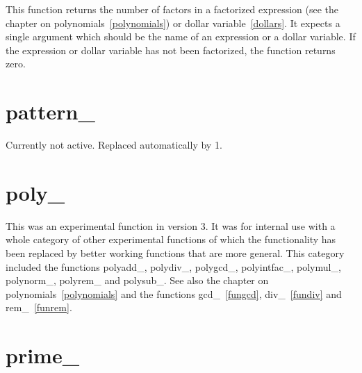 \noindent This function returns the number of factors in a factorized 
expression (see the chapter on polynomials~\ref{polynomials}) or dollar 
variable~\ref{dollars}. It expects a single argument which should be the 
name of an expression or a dollar variable. If the expression or dollar 
variable has not been factorized, the function returns zero.


\section{pattern\_}
\label{funpattern}
\noindent Currently not active. Replaced automatically by 1.


\section{poly\_}
\label{funpoly}
\noindent This was an experimental function in version 3. It was for 
internal use with a whole category of other experimental functions of which 
the functionality has been replaced by better working functions that are 
more general. This category included the functions 
polyadd\_,
polydiv\_,
polygcd\_,
polyintfac\_,
polymul\_,
polynorm\_,
polyrem\_ and
polysub\_.
See also the chapter on polynomials~\ref{polynomials} and the functions 
gcd\_~\ref{fungcd}, div\_~\ref{fundiv} and rem\_~\ref{funrem}.


\section{prime\_}
\label{funprime}

